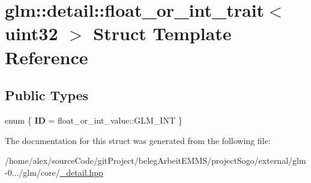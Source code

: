 \hypertarget{structglm_1_1detail_1_1float__or__int__trait_3_01uint32_01_4}{\section{glm\-:\-:detail\-:\-:float\-\_\-or\-\_\-int\-\_\-trait$<$ uint32 $>$ Struct Template Reference}
\label{structglm_1_1detail_1_1float__or__int__trait_3_01uint32_01_4}
}
\subsection*{Public Types}
\begin{DoxyCompactItemize}
\item 
enum \{ {\bfseries I\-D} = float\-\_\-or\-\_\-int\-\_\-value\-:\-:G\-L\-M\-\_\-\-I\-N\-T
 \}
\end{DoxyCompactItemize}


The documentation for this struct was generated from the following file\-:\begin{DoxyCompactItemize}
\item 
/home/alex/source\-Code/git\-Project/beleg\-Arbeit\-E\-M\-M\-S/project\-Sogo/external/glm-\/0.../glm/core/\hyperlink{__detail_8hpp}{\-\_\-detail.\-hpp}\end{DoxyCompactItemize}
